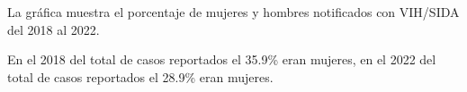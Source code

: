 La gráfica muestra el porcentaje de mujeres y hombres notificados con VIH/SIDA del 2018 al 2022. 

En el 2018 del total de casos reportados el 35.9\% eran mujeres, en el 2022 del total de casos reportados el 28.9\% eran mujeres. 